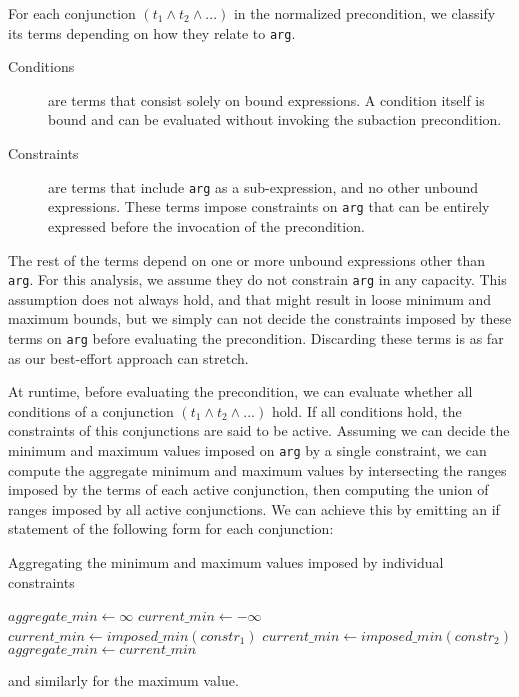 For each conjunction $(t_1 \land t_2 \land ...)$ in the normalized precondition, we classify its terms depending on how they relate to \texttt{arg}.
\begin{description}
    \item [Conditions] are terms that consist solely on bound expressions. A condition itself is bound and can be evaluated without invoking the subaction precondition.
    \item [Constraints] are terms that include \texttt{arg} as a sub-expression, and no other unbound expressions.
    These terms impose constraints on \texttt{arg} that can be entirely expressed before the invocation of the precondition.
\end{description}
The rest of the terms depend on one or more unbound expressions other than \texttt{arg}.
For this analysis, we assume they do not constrain \texttt{arg} in any capacity.
This assumption does not always hold, and that might result in loose minimum and maximum bounds, but we simply can not decide the constraints imposed by these terms on \texttt{arg} before evaluating the precondition.
Discarding these terms is as far as our best-effort approach can stretch.

At runtime, before evaluating the precondition, we can evaluate whether all conditions of a conjunction $(t_1 \land t_2 \land ...)$ hold.
If all conditions hold, the constraints of this conjunctions are said to be active.
Assuming we can decide the minimum and maximum values imposed on \texttt{arg} by a single constraint, we can compute the aggregate minimum and maximum values by intersecting the ranges imposed by the terms of each active conjunction,
then computing the union of ranges imposed by all active conjunctions.
We can achieve this by emitting an if statement of the following form for each conjunction:

\begin{algorithm}[H]
    \caption{Aggregating the minimum and maximum values imposed by individual constraints}
    \begin{algorithmic}[1]
    \STATE $aggregate\_min \gets \infty$
            \STATE $current\_min \gets -\infty$
                \STATE $current\_min \gets imposed\_min(constr_1)$
            \ENDIF
                \STATE $current\_min \gets imposed\_min(constr_2)$
            \ENDIF
        \ENDIF
            \STATE $aggregate\_min \gets current\_min$
        \ENDIF
    \ENDFOR
    \end{algorithmic}
\end{algorithm}
and similarly for the maximum value.


